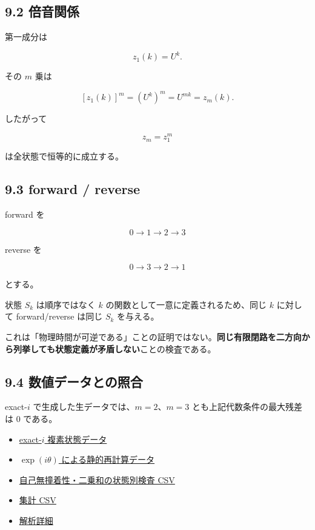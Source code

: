 \documentclass[
  a4paper,
]{ltjsarticle}
\providecommand{\tightlist}{%
  \setlength{\itemsep}{0pt}\setlength{\parskip}{0pt}}
\begin{document}
\subsection{9.2 倍音関係}\label{ux500dux97f3ux95a2ux4fc2}

第一成分は

\[
z_1(k)=U^k.
\]

その \(m\) 乗は

\[
[z_1(k)]^m
=
(U^k)^m
=
U^{mk}
=
z_m(k).
\]

したがって

\[
\boxed{z_m=z_1^m}
\]

は全状態で恒等的に成立する。

\subsection{9.3 forward / reverse}\label{forward-reverse}

forward を

\[
0\to1\to2\to3
\]

reverse を

\[
0\to3\to2\to1
\]

とする。

状態 \(S_k\) は順序ではなく \(k\) の関数として一意に定義されるため、同じ
\(k\) に対して forward/reverse は同じ \(S_k\) を与える。

これは「物理時間が可逆である」ことの証明ではない。\textbf{同じ有限閉路を二方向から列挙しても状態定義が矛盾しない}ことの検査である。

\subsection{9.4
数値データとの照合}\label{ux6570ux5024ux30c7ux30fcux30bfux3068ux306eux7167ux5408}

exact-\(i\) で生成した生データでは、\(m=2\)、\(m=3\)
とも上記代数条件の最大残差は 0 である。

\begin{itemize}
\tightlist
\item
  \href{再現性検証_生データ読出し_20260915/raw_data/complex_states_animation_exact_i.csv}{exact-\(i\)
  複素状態データ}
\item
  \href{再現性検証_生データ読出し_20260915/raw_data/complex_states_static_exp.csv}{\(\exp(i\theta)\)
  による静的再計算データ}
\item
  \href{再現性検証_生データ読出し_20260915/自己無撞着性_二乗和_U4検証_20260915/K4_self_consistency_square_sum_by_state_20260915.csv}{自己無撞着性・二乗和の状態別検査
  CSV}
\item
  \href{再現性検証_生データ読出し_20260915/自己無撞着性_二乗和_U4検証_20260915/K4_self_consistency_square_sum_summary_20260915.csv}{集計
  CSV}
\item
  \href{再現性検証_生データ読出し_20260915/自己無撞着性_二乗和_U4検証_20260915/K4_self_consistency_square_sum_analysis_20260915.md}{解析詳細}
\end{itemize}
\end{document}
